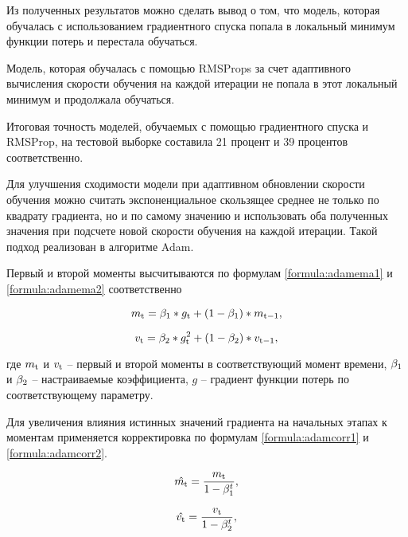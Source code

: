 Из полученных результатов можно сделать вывод о том, что модель, которая обучалась с использованием градиентного спуска попала в локальный минимум функции потерь и перестала обучаться. 

Модель, которая обучалась с помощью RMSProps за счет адаптивного вычисления скорости обучения на каждой итерации не попала в этот локальный минимум и продолжала обучаться.

Итоговая точность моделей, обучаемых с помощью градиентного спуска и RMSProp, на тестовой выборке составила 21 процент и 39 процентов соответственно.

Для улучшения сходимости модели при адаптивном обновлении скорости обучения можно считать экспоненциальное скользящее среднее не только по квадрату градиента, но и по самому значению и использовать оба полученных значения при подсчете новой скорости обучения на каждой итерации. Такой подход реализован в алгоритме Adam.

Первый и второй моменты высчитываются по формулам \ref{formula:adamema1} и \ref{formula:adamema2} соответственно

\begin{equation}\label{formula:adamema1}
m_{\rm{t}} = \beta_{\rm{1}} * g_{\rm{t}} + (1 - \beta_{\rm{1}}) * m_{\rm{t-1}},
\end{equation}

\begin{equation}\label{formula:adamema2}
v_{\rm{t}} = \beta_{\rm{2}} * g_{\rm{t}}^2 + (1 - \beta_{\rm{2}}) * v_{\rm{t-1}},
\end{equation}

где $m_{\rm{t}}$ и $v_{\rm{t}}$ -- первый и второй моменты в соответствующий момент времени, $\beta_{\rm{1}}$ и $\beta_{\rm{2}}$ -- настраиваемые коэффициента, $g$ -- градиент функции потерь по соответствующему параметру.

Для увеличения влияния истинных значений градиента на начальных этапах к моментам применяется корректировка по формулам \ref{formula:adamcorr1} и \ref{formula:adamcorr2}.

\begin{equation}\label{formula:adamcorr1}
\hat{m_{\rm{t}}} = \frac{m_{\rm{t}}}{1 - \beta_{\rm{1}}^t},
\end{equation}

\begin{equation}\label{formula:adamcorr2}
\hat{v_{\rm{t}}} = \frac{v_{\rm{t}}}{1 - \beta_{\rm{2}}^t},
\end{equation}

